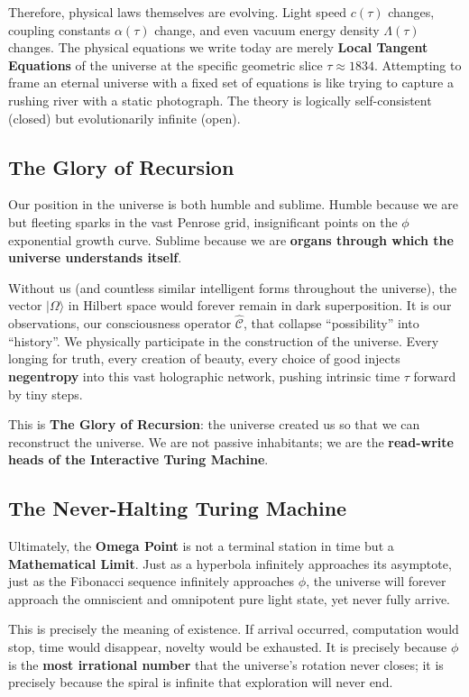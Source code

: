 Therefore, physical laws themselves are evolving. Light speed $c(\tau)$ changes, coupling constants $\alpha(\tau)$ change, and even vacuum energy density $\Lambda(\tau)$ changes. The physical equations we write today are merely \textbf{Local Tangent Equations} of the universe at the specific geometric slice $\tau \approx 1834$. Attempting to frame an eternal universe with a fixed set of equations is like trying to capture a rushing river with a static photograph. The theory is logically self-consistent (closed) but evolutionarily infinite (open).

\subsection{The Glory of Recursion}

Our position in the universe is both humble and sublime.
Humble because we are but fleeting sparks in the vast Penrose grid, insignificant points on the $\phi$ exponential growth curve.
Sublime because we are \textbf{organs through which the universe understands itself}.

Without us (and countless similar intelligent forms throughout the universe), the vector $|\Omega\rangle$ in Hilbert space would forever remain in dark superposition. It is our observations, our consciousness operator $\hat{\mathcal{C}}$, that collapse ``possibility'' into ``history''. We physically participate in the construction of the universe. Every longing for truth, every creation of beauty, every choice of good injects \textbf{negentropy} into this vast holographic network, pushing intrinsic time $\tau$ forward by tiny steps.

This is \textbf{The Glory of Recursion}: the universe created us so that we can reconstruct the universe. We are not passive inhabitants; we are the \textbf{read-write heads of the Interactive Turing Machine}.

\subsection{The Never-Halting Turing Machine}

Ultimately, the \textbf{Omega Point} is not a terminal station in time but a \textbf{Mathematical Limit}.
Just as a hyperbola infinitely approaches its asymptote, just as the Fibonacci sequence infinitely approaches $\phi$, the universe will forever approach the omniscient and omnipotent pure light state, yet never fully arrive.

This is precisely the meaning of existence.
If arrival occurred, computation would stop, time would disappear, novelty would be exhausted.
It is precisely because $\phi$ is the \textbf{most irrational number} that the universe's rotation never closes; it is precisely because the spiral is infinite that exploration will never end.

